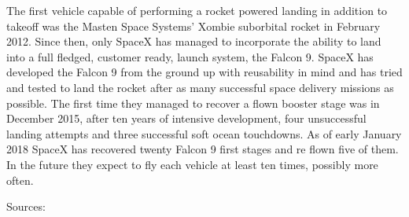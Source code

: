The first vehicle capable of performing a rocket powered landing in addition to takeoff was the Masten Space Systems' Xombie suborbital rocket in February 2012. Since then, only SpaceX has managed to incorporate the ability to land into a full fledged, customer ready, launch system, the Falcon 9. SpaceX has developed the Falcon 9 from the ground up with reusability in mind and has tried and tested to land the rocket after as many successful space delivery missions as possible. The first time they managed to recover a flown booster stage was in December 2015, after ten years of intensive development, four unsuccessful landing attempts and three successful soft ocean touchdowns. As of early January 2018 SpaceX has recovered twenty Falcon 9 first stages and re flown five of them. In the future they expect to fly each vehicle at least ten times, possibly more often.

Sources:





